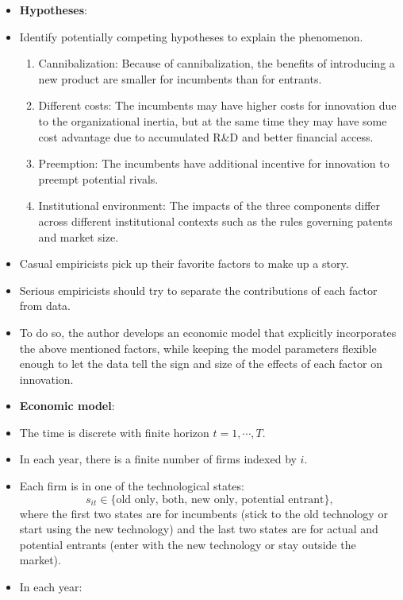 \documentclass[
]{book}
\providecommand{\tightlist}{%
  \setlength{\itemsep}{0pt}\setlength{\parskip}{0pt}}
\begin{document}
\begin{itemize}
\item
  \textbf{Hypotheses}:
\item
  Identify potentially competing hypotheses to explain the phenomenon.

  \begin{enumerate}
  \def\labelenumi{\arabic{enumi}.}
  \tightlist
  \item
    Cannibalization: Because of cannibalization, the benefits of introducing a new product are smaller for incumbents than for entrants.
  \item
    Different costs: The incumbents may have higher costs for innovation due to the organizational inertia, but at the same time they may have some cost advantage due to accumulated R\&D and better financial access.
  \item
    Preemption: The incumbents have additional incentive for innovation to preempt potential rivals.
  \item
    Institutional environment: The impacts of the three components differ across different institutional contexts such as the rules governing patents and market size.
  \end{enumerate}
\item
  Casual empiricists pick up their favorite factors to make up a story.
\item
  Serious empiricists should try to separate the contributions of each factor from data.
\item
  To do so, the author develops an economic model that explicitly incorporates the above mentioned factors, while keeping the model parameters flexible enough to let the data tell the sign and size of the effects of each factor on innovation.
\item
  \textbf{Economic model}:
\item
  The time is discrete with finite horizon \(t = 1, \cdots, T\).
\item
  In each year, there is a finite number of firms indexed by \(i\).
\item
  Each firm is in one of the technological states:
  \begin{equation}
  s_{it} \in \{\text{old only, both, new only, potential entrant}\},
  \end{equation}
  where the first two states are for incumbents (stick to the old technology or start using the new technology) and the last two states are for actual and potential entrants (enter with the new technology or stay outside the market).
\item
  In each year:


\end{itemize}
\end{document}
